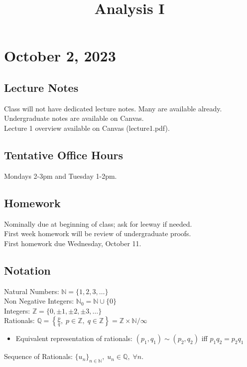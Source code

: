 \documentclass[11pt]{article}
\date{}
\title{Analysis I}
\newcommand{\0}{\emptyset}
\newcommand{\N}{\mathbb{N}}
\newcommand{\Z}{\mathbb{Z}}
\newcommand{\Q}{\mathbb{Q}}
\begin{document}
\maketitle
\section*{October 2, 2023}
\label{sec:orga0dee16}
\subsection*{Lecture Notes}
\label{sec:org19e412e}
Class will not have dedicated lecture notes. Many are available already.\\[0pt]
Undergraduate notes are available on Canvas.\\[0pt]
Lecture 1 overview available on Canvas (lecture1.pdf).\\[0pt]
\subsection*{Tentative Office Hours}
\label{sec:org8144515}
Mondays 2-3pm and Tuesday 1-2pm.\\[0pt]
\subsection*{Homework}
\label{sec:org9435cab}
Nominally due at beginning of class; ask for leeway if needed.\\[0pt]
First week homework will be review of undergraduate proofs.\\[0pt]
First homework due Wednesday, October 11.\\[0pt]
\subsection*{Notation}
\label{sec:org2143175}
Natural Numbers: \(\N=\{1,2,3,\ldots\}\)\\[0pt]
Non Negative Integers: \(\N_{0}=\N\cup\{0\}\)\\[0pt]
Integers: \(\Z=\{0,\pm1,\pm2,\pm3,\ldots\}\)\\[0pt]
Rationals: \(\Q=\left\{ \frac{p}{q},\;p\in\Z,\;q\in\Z \right\} = \Z\times\N/\infty\)\\[0pt]
\begin{itemize}
\item Equivalent representation of rationals: \((p_{1},q_{1})\sim(p_{2},q_{2})\) iff \(p_{1}q_{2}=p_{2}q_{1}\)\\[0pt]
\end{itemize}
Sequence of Rationals: \(\{u_{n}\}_{n\in\N},\;u_{n}\in\Q,\;\forall n\).\\[0pt]
\end{document}

